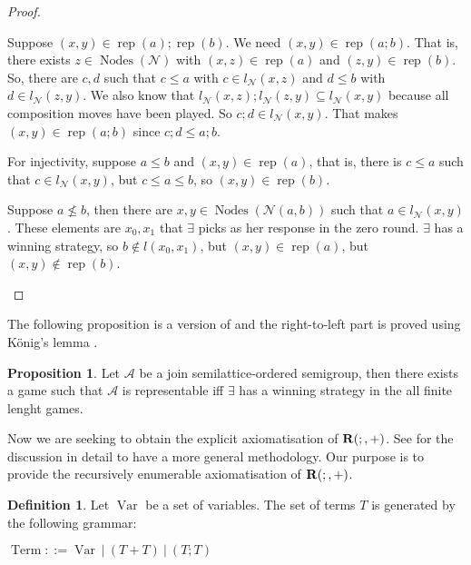 \documentclass[a4paper]{article}
\theoremstyle{definition}
\newtheorem{definition}{Definition}
\theoremstyle{theorem}
\theoremstyle{proposition}
\newtheorem{proposition}{Proposition}
\theoremstyle{lemma}
\theoremstyle{ex}
\theoremstyle{corollary}
\theoremstyle{claim}
\begin{document}
\begin{proof}
\begin{enumerate}
Suppose $(x, y) \in \operatorname{rep}(a) ; \operatorname{rep}(b)$. We need $(x, y) \in \operatorname{rep}(a;b)$. That is, there exists $z \in \operatorname{Nodes}(\mathcal{N})$ with $(x, z) \in \operatorname{rep}(a)$ and $(z, y) \in \operatorname{rep}(b)$. So, there are $c, d$ such that $c \leq a$ with $c \in l_{\mathcal{N}}(x, z)$ and $d \leq b$ with $d \in l_{\mathcal{N}}(z, y)$.
We also know that $l_{\mathcal{N}}(x, z) ; l_{\mathcal{N}}(z, y) \subseteq l_{\mathcal{N}}(x, y)$ because all composition moves have been played.
So $c ; d \in l_{\mathcal{N}}(x, y)$. That makes $(x, y) \in \operatorname{rep}(a;b)$ since $c ; d \leq a ; b$.

For injectivity, suppose $a \leq b$ and $(x, y) \in \operatorname{rep}(a)$, that is, there is $c \leq a$ such that $c \in l_{\mathcal{N}}(x, y)$, but $c \leq a \leq b$, so $(x, y) \in \operatorname{rep}(b)$.

Suppose $a \not\leq b$, then there are $x, y \in \operatorname{Nodes}(\mathcal{N}(a, b))$ such that $a \in l_{\mathcal{N}}(x, y)$. These elements are $x_0, x_1$ that $\exists$ picks as her response in the zero round. $\exists$ has a winning strategy, so $b \notin l(x_0, x_1)$, but $(x,y) \in \operatorname{rep}(a)$, but $(x,y) \notin \operatorname{rep}(b)$.
  \end{enumerate}
\end{proof}

The following proposition is a version of \cite[Proposition 7.24]{hirsch2002relation} and the right-to-left part is proved using K\"{o}nig's lemma \cite[Exercise 5.6.5]{hodges1993model}.

\begin{proposition} \label{fin}
  Let $\mathcal{A}$ be a join semilattice-ordered semigroup, then there exists a game such that $\mathcal{A}$ is representable iff $\exists$ has a winning strategy in the all finite lenght games.
\end{proposition}

Now we are seeking to obtain the explicit axiomatisation of ${\bf R}(;, +)$. See \cite[Chapter 9]{hirsch2002relation} for the discussion in detail to have a more general methodology. Our purpose is to provide the recursively enumerable axiomatisation of ${\bf R}(;, +)$.

\begin{definition}
  Let $\operatorname{Var}$ be a set of variables. The set of terms $T$ is generated by the following grammar:

  \begin{center}
    $\operatorname{Term} ::= \operatorname{Var} \: | \: (T + T) \: | \: (T ; T)$
  \end{center}
\end{definition}
\end{document}
